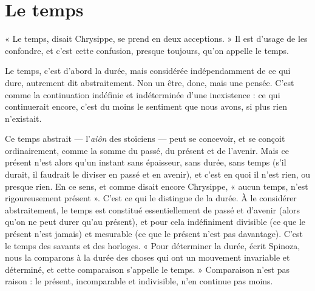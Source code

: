 
\section{Le temps}
« Le temps, disait Chrysippe, se prend en deux acceptions. » Il est
d’usage de les confondre, et c’est cette confusion, presque toujours,
qu’on appelle le temps.

Le temps, c’est d’abord la durée, mais considérée indépendamment de ce
qui dure, autrement dit abstraitement. Non un être, donc, mais une pensée.
C’est comme la continuation indéfinie et indéterminée d’une inexistence : ce
qui continuerait encore, c’est du moins le sentiment que nous avons, si plus
rien n'existait.

Ce temps abstrait — l’{\it aiôn} des stoïciens — peut se concevoir, et se conçoit
ordinairement, comme la somme du passé, du présent et de l’avenir. Mais ce
présent n’est alors qu’un instant sans épaisseur, sans durée, sans temps (s’il
durait, il faudrait le diviser en passé et en avenir), et c’est en quoi il n’est rien,
ou presque rien. En ce sens, et comme disait encore Chrysippe, « aucun temps,
n’est rigoureusement présent ». C’est ce qui le distingue de la durée. À le considérer
abstraitement, le temps est constitué essentiellement de passé et d’avenir
(alors qu’on ne peut durer qu’au présent), et pour cela indéfiniment divisible
(ce que le présent n’est jamais) et mesurable (ce que le présent n’est pas davantage).
C’est le temps des savants et des horloges. « Pour déterminer la durée,
écrit Spinoza, nous la comparons à la durée des choses qui ont un mouvement
invariable et déterminé, et cette comparaison s’appelle le temps. » Comparaison
n’est pas raison : le présent, incomparable et indivisible, n’en continue pas
moins.

